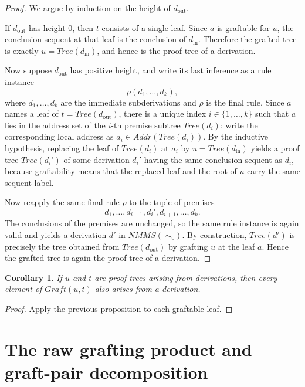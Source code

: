 \documentclass[11pt]{article}
\newtheorem{corollary}[theorem]{Corollary}
\newcommand{\mszero}{\mathrel{\mid\!\sim_{0}}}
\newcommand{\NMMS}{\mathit{NMMS}}
\newcommand{\Addr}{\mathit{Addr}}
\newcommand{\Tree}{\mathit{Tree}}
\newcommand{\Graft}{\mathit{Graft}}
\begin{document}
\begin{proof}
We argue by induction on the height of \(d_{\mathrm{out}}\).

If \(d_{\mathrm{out}}\) has height \(0\), then \(t\) consists of a single leaf.
Since \(a\) is graftable for \(u\), the conclusion sequent at that leaf is the
conclusion of \(d_{\mathrm{in}}\). Therefore the grafted tree is exactly
\(u=\Tree(d_{\mathrm{in}})\), and hence is the proof tree of a derivation.

Now suppose \(d_{\mathrm{out}}\) has positive height, and write its last
inference as a rule instance
\[
\rho(d_1,\dots,d_k),
\]
where \(d_1,\dots,d_k\) are the immediate subderivations and \(\rho\) is the
final rule. Since \(a\) names a leaf of \(t=\Tree(d_{\mathrm{out}})\), there is
a unique index \(i\in\{1,\dots,k\}\) such that \(a\) lies in the address set of
the \(i\)-th premise subtree \(\Tree(d_i)\); write the corresponding local
address as \(a_i\in \Addr(\Tree(d_i))\). By the inductive hypothesis, replacing
the leaf of \(\Tree(d_i)\) at \(a_i\) by \(u=\Tree(d_{\mathrm{in}})\) yields a
proof tree \(\Tree(d_i')\) of some derivation \(d_i'\) having the same
conclusion sequent as \(d_i\), because graftability means that the replaced
leaf and the root of \(u\) carry the same sequent label.

Now reapply the same final rule \(\rho\) to the tuple of premises
\[
d_1,\dots,d_{i-1},d_i',d_{i+1},\dots,d_k.
\]
The conclusions of the premises are unchanged, so the same rule instance is
again valid and yields a derivation \(d'\) in \(\NMMS(\mszero)\). By
construction, \(\Tree(d')\) is precisely the tree obtained from
\(\Tree(d_{\mathrm{out}})\) by grafting \(u\) at the leaf \(a\). Hence the
grafted tree is again the proof tree of a derivation.
\end{proof}

\begin{corollary}
If \(u\) and \(t\) are proof trees arising from derivations, then every element
of \(\Graft(u,t)\) also arises from a derivation.
\end{corollary}

\begin{proof}
Apply the previous proposition to each graftable leaf.
\end{proof}

\section{The raw grafting product and graft-pair decomposition}
\end{document}
